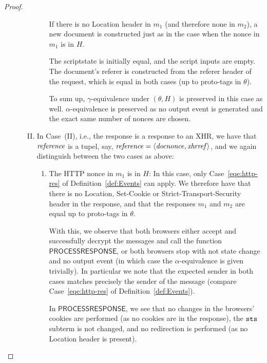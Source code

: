 \begin{theorem}
\begin{proof}
\begin{description}
\begin{enumerate}[I.]
\begin{enumerate}
              If there is no Location header in $m_1$ (and therefore none in
              $m_2$), a new document is constructed just as in the case when
              the nonce in $m_1$ is in $H$.
      
              The scriptstate is initially equal, and the script inputs are
              empty. The document's referer is constructed from the referer
              header of the request, which is equal in both cases (up to
              proto-tags in $\theta$).
      
              To sum up, $\gamma$-equivalence under $(\theta, H)$ is
              preserved in this case as well. $\alpha$-equivalence is
              preserved as no output event is generated and the exact same
              number of nonces are chosen.
          \end{enumerate}
        \item\label{browser-http-response-xhr}
          In Case~(II), i.e., the response is a response to an XHR, 
          we have that $\mathit{reference}$ is a tupel, say,
          $\mathit{reference} = \langle\mathit{docnonce}, \mathit{xhrref}\rangle$, 
          and we again distinguish between the two cases as above:
          \begin{enumerate}
            \item The HTTP nonce in $m_1$ is in $H$: In this case, only
              Case~\ref{eqe:http-res} of Definition~\ref{def:Events}
              can apply. We therefore have that there is no Location,
              Set-Cookie or Strict-Transport-Security header in the
              response, and that the responses $m_1$ and $m_2$ are equal up
              to proto-tags in $\theta$.
      
              With this, we observe that both browsers either accept and
              successfully decrypt the messages and call the function
              $\mathsf{PROCESSRESPONSE}$, or both browsers stop with not
              state change and no output event (in which case the
              $\alpha$-equivalence is given trivially). In particular we
              note that the expected sender in both cases matches precisely
              the sender of the message (compare Case~\ref{eqe:http-res} of
              Definition~\ref{def:Events}).
      
              In $\mathsf{PROCESSRESPONSE}$, we see that no changes in the
              browsers' cookies are performed (as no cookies are in the
              response), the $\mathtt{sts}$ subterm is not changed, and no
              redirection is performed (as no Location header is present).
      

\end{enumerate}
\end{enumerate}
\end{description}
\end{proof}
\end{theorem}
